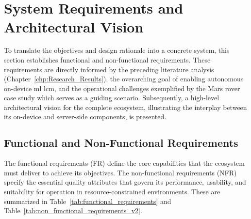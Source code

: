 \section{System Requirements and Architectural Vision}
\label{sec:framework_requirements_vision}

To translate the objectives and design rationale into a concrete system, this section establishes functional and non-functional requirements. These requirements are directly informed by the preceding literature analysis (Chapter~\ref{chp:Research_Results}), the overarching goal of enabling autonomous on-device \gls{ml} \gls{lcm}, and the operational challenges exemplified by the Mars rover case study which serves as a guiding scenario. Subsequently, a high-level architectural vision for the complete ecosystem, illustrating the interplay between its on-device and server-side components, is presented.

\subsection{Functional and Non-Functional Requirements}
\label{ssec:framework_requirements}

The functional requirements (FR) define the core capabilities that the ecosystem must deliver to achieve its objectives. The non-functional requirements (NFR) specify the essential quality attributes that govern its performance, usability, and suitability for operation in resource-constrained environments. These are summarized in Table~\ref{tab:functional_requirements} and Table~\ref{tab:non_functional_requirements_v2}.

